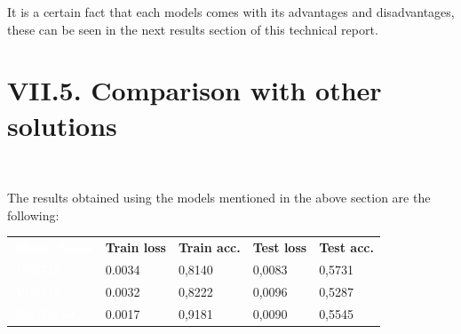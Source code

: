 \documentclass[11pt, a4papper]{report}
\theoremstyle{plain}
\theoremstyle{definition}
\theoremstyle{definition}
\theoremstyle{proposition}
\begin{document}
It is a certain fact that each models comes with its advantages and disadvantages, these can be seen in the next results section of this technical report. 


\section*{VII.5. Comparison with other solutions}
\

The results obtained using the models mentioned in the above section are the following:
\begin{center}
\begin{footnotesize}
\begin{tabular}{ | M{4.6cm} | m{2cm} | m{2cm} |m{2cm} | m{2cm}} 
\hline
{} \\
\hline
{}
\textit{\textbf{\textcolor{white} {\textbf{Model Name}}}} &   \textbf{Train loss} &   \textbf{Train acc.} 
&   \textbf{Test loss} 
&   \textbf{Test acc.}  \\
\hline
{}
\textit{\textbf{\textcolor{white}{VGG16}}}&   {0.0034} &   {0,8140} 
&   {0,0083} 
&   {0,5731}  \\
\hline
{}
\textit{\textbf{\textcolor{white}{VGG19}}}&   {0.0032} &   {0,8222} 
&   {0,0096} 
&   {0,5287}  \\
\hline
{}
\textit{\textbf{\textcolor{white}{ResNet50}}}&   {0.0017} &   {0,9181} 
&   {0,0090} 
&   {0,5545}  \\
\hline

\end{tabular}
\end{footnotesize}
\end{center}
\end{document}
